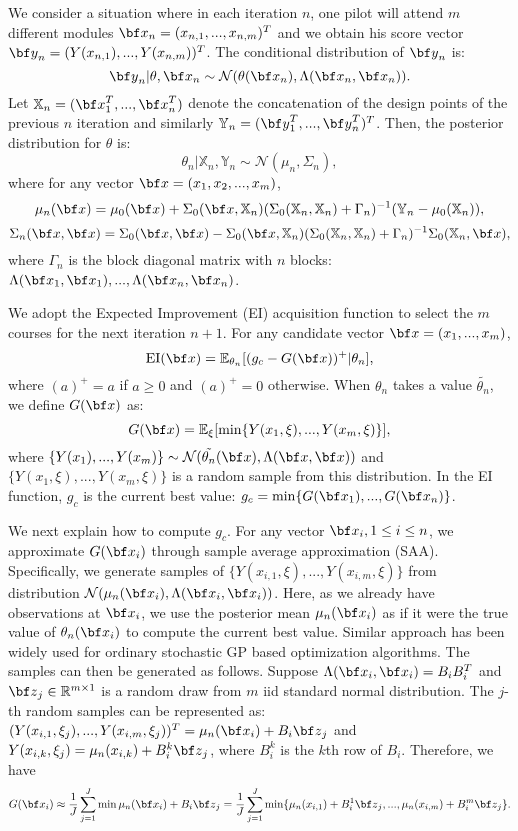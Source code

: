 \documentclass[opre,sglanonrev]{informs4}
\begin{document}
We consider a situation where in each iteration $n$, one pilot will attend $m$ different modules ${\bf x}_n = (x_{n,1},...,x_{n,m})^T$ and we obtain his score vector ${\bf y}_n = (Y(x_{n,1}),...,Y(x_{n,m}))^T$. The conditional distribution of ${\bf y}_n$ is:
$${\bf y}_n | \theta,{\bf x}_n \sim \mathcal{N}(\theta({\bf x}_n), \Lambda({\bf x}_n,{\bf x}_n)). $$ 
Let $\mathbb{X}_n = ({\bf x}_1^T,...,{\bf x}_n^T )$ denote the concatenation of the design points of the previous $n$ iteration and similarly $\mathbb{Y}_n =({\bf y}_1^T,...,{\bf y}_n^T )^T$. Then, the posterior distribution for $\theta$ is:
$$\theta_n|\mathbb{X}_n,\mathbb{Y}_n  \sim \mathcal{N}(\mu_n, \Sigma_n),$$
where for any vector ${\bf x} = (x_1, x_2,...,x_m)$,
$$
	\mu_n({\bf x}) = \mu_0({\bf x}) + \Sigma_0(\bf x, \mathbb{X}_n)(\Sigma_0(\mathbb{X}_n,\mathbb{X}_n) + \Gamma_n)^{-1}(\mathbb{Y}_n-\mu_0(\mathbb{X}_n)),
$$
$$
	\Sigma_n({\bf x},{\bf x}) = \Sigma_0({\bf x},{\bf x}) - \Sigma_0(\bf x, \mathbb{X}_n)(\Sigma_0(\mathbb{X}_n,\mathbb{X}_n) + \Gamma_n)^{-1}\Sigma_0(\mathbb{X}_n, \bf x),
$$
where $\Gamma_n$ is the block diagonal matrix with $n$ blocks: $\Lambda({\bf x}_1, {\bf x}_1),...,\Lambda({\bf x}_n, {\bf x}_n)$.

We adopt the Expected Improvement (EI) acquisition function to select the $m$ courses for the next iteration $n+1$. For any candidate vector ${\bf x}=(x_1,...,x_m)$,
$$ 
\text{EI}({\bf x}) = \mathbb{E}_{\theta_n}[(g_c-G({\bf x}))^+ | \theta_n],
$$
where $(a)^+=a$ if $a\geq 0$ and $(a)^+=0$ otherwise. When $\theta_n$ takes a value $\tilde{\theta_n}$, we define $G({\bf x})$ as:
$$
G({\bf x}) = \mathbb{E}_\xi[\min\{Y(x_1,\xi),...,Y(x_m,\xi) \} ],
$$
where $\{Y(x_1),...,Y(x_m)\} \sim \mathcal{N}(\tilde{\theta_n}({\bf x}), \Lambda({\bf x},{\bf x}))$ and $\{Y(x_1,\xi),...,Y(x_m,\xi)\}$ is a random sample from this distribution. In the EI function, $g_c$ is the current best value: $g_c = \min \{G({\bf x}_1),...,G({\bf x}_n)\}$.

We next explain how to compute $g_c$. For any vector ${\bf x}_i, 1\leq i \leq n$, we approximate $G({\bf x}_i)$ through sample average approximation (SAA). Specifically, we generate samples of $\{Y(x_{i,1},\xi),...,Y(x_{i,m},\xi)\}$ from distribution $\mathcal{N}(\mu_n({\bf x}_i), \Lambda({\bf x}_i,{\bf x}_i))$. Here, as we already have observations at ${\bf x}_i$, we use the posterior mean $\mu_n({\bf x}_i)$ as if it were the true value of $\theta_n({\bf x}_i)$ to compute the current best value. Similar approach has been widely used for ordinary stochastic GP based optimization algorithms. The samples can then be generated as follows. Suppose $\Lambda({\bf x}_i,{\bf x}_i) = B_iB_i^T$ and ${\bf z}_j\in \mathbb{R}^{m\times 1}$ is a random draw from $m$ iid standard normal distribution. The $j$-th random samples can be represented as: $(Y(x_{i,1},\xi_j),...,Y(x_{i,m},\xi_j))^T = \mu_n({\bf x}_i) + B_i{\bf z}_j$ and $Y(x_{i,k},\xi_j) = \mu_n({x}_{i,k}) + B_i^k{\bf z}_j$, where $B_i^k$ is the $k$th row of $B_i$. Therefore, we have
$$ 
G({\bf x}_i) \approx \frac{1}{J}\sum_{j=1}^{J} \min \mu_n({\bf x}_i) + B_i{\bf z}_j = \frac{1}{J}\sum_{j=1}^{J} \min \{\mu_n({x}_{i,1}) + B_i^1{\bf z}_j, ...,\mu_n({x}_{i,m}) + B_i^m{\bf z}_j  \}.
$$
\end{document}
